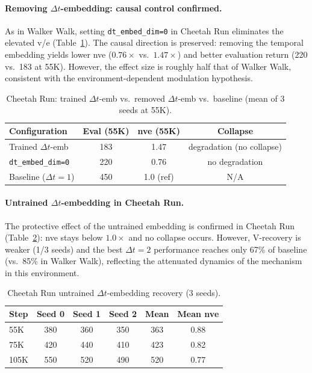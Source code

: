 \documentclass[letterpaper]{article}
\begin{document}
\paragraph{Removing $\Delta t$-embedding: causal control confirmed.}
As in Walker Walk, setting \texttt{dt\_embed\_dim=0} in Cheetah Run eliminates the elevated v/e (Table~\ref{tab:cheetah-control}).
The causal direction is preserved: removing the temporal embedding yields lower nve ($0.76\times$ vs.\ $1.47\times$) and better evaluation return (220 vs.\ 183 at 55K).
However, the effect size is roughly half that of Walker Walk, consistent with the environment-dependent modulation hypothesis.

\begin{table}[h]
\centering
\caption{Cheetah Run: trained $\Delta t$-emb vs.\ removed $\Delta t$-emb vs.\ baseline (mean of 3 seeds at 55K).}
\label{tab:cheetah-control}
\begin{tabular}{lccc}
\toprule
Configuration & Eval (55K) & nve (55K) & Collapse \\
\midrule
Trained $\Delta t$-emb & 183 & 1.47 & degradation (no collapse) \\
\texttt{dt\_embed\_dim=0} & 220 & 0.76 & no degradation \\
Baseline ($\Delta t{=}1$) & 450 & 1.0 (ref) & N/A \\
\bottomrule
\end{tabular}
\end{table}

\paragraph{Untrained $\Delta t$-embedding in Cheetah Run.}
The protective effect of the untrained embedding is confirmed in Cheetah Run (Table~\ref{tab:cheetah-untrained}): nve stays below $1.0\times$ and no collapse occurs.
However, V-recovery is weaker (1/3 seeds) and the best $\Delta t{=}2$ performance reaches only 67\% of baseline (vs.\ 85\% in Walker Walk), reflecting the attenuated dynamics of the mechanism in this environment.

\begin{table}[h]
\centering
\caption{Cheetah Run untrained $\Delta t$-embedding recovery (3 seeds).}
\label{tab:cheetah-untrained}
\begin{tabular}{lccccc}
\toprule
Step & Seed 0 & Seed 1 & Seed 2 & Mean & Mean nve \\
\midrule
55K  & 380 & 360 & 350 & 363 & 0.88 \\
75K  & 420 & 440 & 410 & 423 & 0.82 \\
105K & 550 & 520 & 490 & 520 & 0.77 \\
\bottomrule
\end{tabular}
\end{table}
\end{document}
